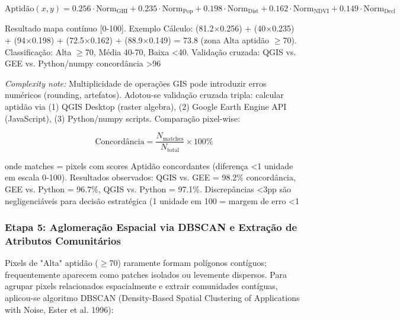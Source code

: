 \documentclass[12pt, a4paper]{article}
\begin{document}
\begin{equation}
\text{Aptidão}(x,y) = 0.256 \cdot \text{Norm}_{\text{GHI}} + 0.235 \cdot \text{Norm}_{\text{Pop}} + 0.198 \cdot \text{Norm}_{\text{Dist}} + 0.162 \cdot \text{Norm}_{\text{NDVI}} + 0.149 \cdot \text{Norm}_{\text{Decl}}
\end{equation}

Resultado mapa contínuo [0-100]. Exemplo Cálculo: (81.2×0.256) + (40×0.235) + (94×0.198) + (72.5×0.162) + (88.9×0.149) = 73.8 (zona Alta aptidão $\geq$70). Classificação: Alta $\geq$70, Média 40-70, Baixa <40. Validação cruzada: QGIS vs. GEE vs. Python/numpy concordância >96%

\textit{Complexity note:} Multiplicidade de operações GIS pode introduzir erros numéricos (rounding, artefatos). Adotou-se validação cruzada tripla: calcular aptidão via (1) QGIS Desktop (raster algebra), (2) Google Earth Engine API (JavaScript), (3) Python/numpy scripts. Comparação pixel-wise:

\begin{equation}
\text{Concordância} = \frac{N_{\text{matches}}}{N_{\text{total}}} \times 100\%
\end{equation}

onde matches = pixels com scores Aptidão concordantes (diferença <1 unidade em escala 0-100). Resultados observados: QGIS vs. GEE = 98.2\% concordância, GEE vs. Python = 96.7\%, QGIS vs. Python = 97.1\%. Discrepâncias <3pp são negligenciáveis para decisão estratégica (1 unidade em 100 = margem de erro <1%

\subsubsection{Etapa 5: Aglomeração Espacial via DBSCAN e Extração de Atributos Comunitários}

Pixels de "Alta" aptidão ($\geq$70) raramente formam polígonos contíguos; frequentemente aparecem como patches isolados ou levemente dispersos. Para agrupar pixels relacionados espacialmente e extrair comunidades contíguas, aplicou-se algoritmo DBSCAN (Density-Based Spatial Clustering of Applications with Noise, Ester et al. 1996):
\end{document}

